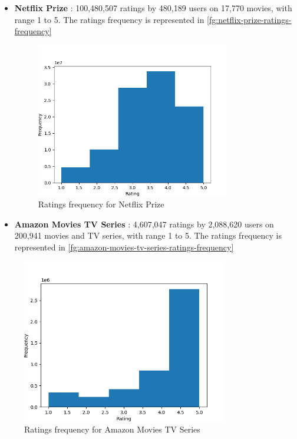 \begin{itemize}
\begin{figure}[htb]
\label{fg:movielens-hetrec-2011-ratings-frequency}
\end{figure}
\item \textbf{Netflix Prize} \cite{netflix-prize-dataset, 10.1145/1864708.1864721}: 100,480,507 ratings by 480,189 users on 17,770 movies, with range 1 to 5. The ratings frequency is represented in \autoref{fg:netflix-prize-ratings-frequency}
\begin{figure}[htb]
\centering
\includegraphics[width=0.8\textwidth]{pictures/netflix-prize-ratings-frequency}
\caption{Ratings frequency for Netflix Prize}
\label{fg:netflix-prize-ratings-frequency}
\end{figure}
\item \textbf{Amazon Movies TV Series} \cite{amazon-movies-tv-series-dataset}: 4,607,047 ratings by 2,088,620 users on 200,941 movies and TV series, with range 1 to 5. The ratings frequency is represented in \autoref{fg:amazon-movies-tv-series-ratings-frequency}
\end{itemize}
\begin{figure}[htb]
\centering
\includegraphics[width=0.8\textwidth]{pictures/amazon-movies-tv-series-ratings-frequency}
\caption{Ratings frequency for Amazon Movies TV Series}
\label{fg:amazon-movies-tv-series-ratings-frequency}
\end{figure}
